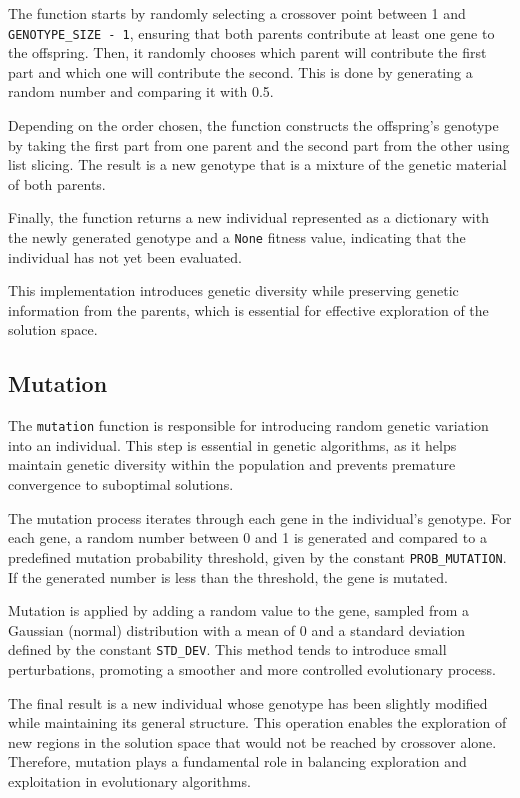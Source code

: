 \documentclass{article}
\begin{document}
The function starts by randomly selecting a crossover point between 1 and \texttt{GENOTYPE\_SIZE - 1}, ensuring that both parents contribute at least one gene to the offspring. Then, it randomly chooses which parent will contribute the first part and which one will contribute the second. This is done by generating a random number and comparing it with 0.5.

Depending on the order chosen, the function constructs the offspring's genotype by taking the first part from one parent and the second part from the other using list slicing. The result is a new genotype that is a mixture of the genetic material of both parents.

Finally, the function returns a new individual represented as a dictionary with the newly generated genotype and a \texttt{None} fitness value, indicating that the individual has not yet been evaluated.

This implementation introduces genetic diversity while preserving genetic information from the parents, which is essential for effective exploration of the solution space.

\subsection{Mutation}
The \texttt{mutation} function is responsible for introducing random genetic variation into an individual. This step is essential in genetic algorithms, as it helps maintain genetic diversity within the population and prevents premature convergence to suboptimal solutions.

The mutation process iterates through each gene in the individual's genotype. For each gene, a random number between 0 and 1 is generated and compared to a predefined mutation probability threshold, given by the constant \texttt{PROB\_MUTATION}. If the generated number is less than the threshold, the gene is mutated.

Mutation is applied by adding a random value to the gene, sampled from a Gaussian (normal) distribution with a mean of 0 and a standard deviation defined by the constant \texttt{STD\_DEV}. This method tends to introduce small perturbations, promoting a smoother and more controlled evolutionary process.

The final result is a new individual whose genotype has been slightly modified while maintaining its general structure. This operation enables the exploration of new regions in the solution space that would not be reached by crossover alone. Therefore, mutation plays a fundamental role in balancing exploration and exploitation in evolutionary algorithms.
\end{document}
